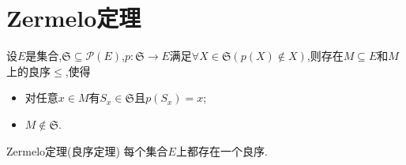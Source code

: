 \section{Zermelo定理}

\begin{lemma}{}{}
	设$E$是集合,$\mathfrak{S}\subseteq\mathcal{P}\left(E\right)$,$p:\mathfrak{S}\to E$满足$\forall X\in\mathfrak{S}\left(p\left(X\right)\notin X\right)$,则存在$M\subseteq E$和$M$上的良序$\leq$,使得
	\begin{itemize}
		\item 对任意$x\in M$有$S_{x}\in\mathfrak{S}$且$p\left(S_{x}\right)=x$;
		\item $M\notin\mathfrak{S}$.
	\end{itemize}
\end{lemma}

\begin{theorem}{Zermelo定理(良序定理)}{}
	每个集合$E$上都存在一个良序.
\end{theorem}






